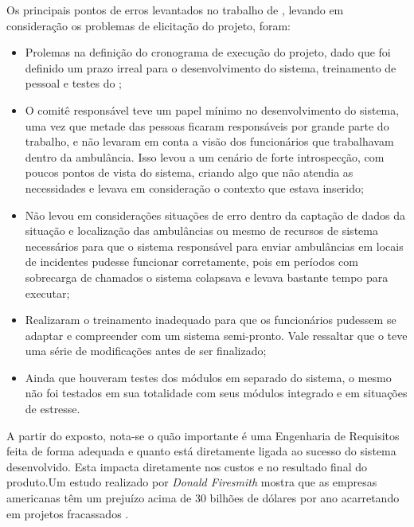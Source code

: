 Os principais pontos de erros levantados no trabalho de \cite{LodonFiasco}, levando em consideração os problemas de elicitação do projeto, foram:

\begin{itemize}
    \item Prolemas na definição do cronograma de execução do projeto, dado que foi definido um prazo irreal para o desenvolvimento do sistema, treinamento de pessoal e testes do ;
    
    \item O comitê responsável teve um papel mínimo no desenvolvimento do sistema, uma vez que metade das pessoas ficaram responsáveis por grande parte do trabalho, e não levaram em conta a visão dos funcionários que trabalhavam dentro da ambulância. Isso levou a um cenário de forte introspecção, com poucos pontos de vista do sistema, criando algo que não atendia as necessidades e levava em consideração o contexto que estava inserido;
    
    \item Não levou em considerações situações de erro dentro da captação de dados da situação e localização das ambulâncias ou mesmo de recursos de sistema necessários para que o sistema responsável para enviar ambulâncias em locais de incidentes pudesse funcionar corretamente, pois em períodos com sobrecarga de chamados o sistema colapsava e levava bastante tempo para executar;
    
    \item Realizaram o treinamento inadequado para que os funcionários pudessem se adaptar e compreender com um sistema semi-pronto. Vale ressaltar que o  teve uma série de modificações antes de ser finalizado;
    
    \item Ainda que houveram testes dos módulos em separado do sistema, o mesmo não foi testados em sua totalidade com seus módulos integrado e em situações de estresse.
\end{itemize}

A partir do exposto, nota-se o quão importante é uma Engenharia de Requisitos feita de forma adequada e quanto está diretamente ligada ao sucesso do sistema desenvolvido. Esta impacta diretamente nos custos e no resultado final do produto.Um estudo realizado por \textit{Donald Firesmith} mostra que as empresas americanas têm um prejuízo acima de 30 bilhões de dólares por ano acarretando em projetos fracassados \cite{king2008cost}.